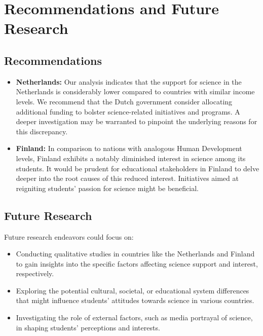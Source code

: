 \documentclass[12pt]{article}
\begin{document}
\section{Recommendations and Future Research}

\subsection{Recommendations}

\begin{itemize}
\item \textbf{Netherlands:} Our analysis indicates that the support for science in the Netherlands is considerably lower compared to countries with similar income levels. We recommend that the Dutch government consider allocating additional funding to bolster science-related initiatives and programs. A deeper investigation may be warranted to pinpoint the underlying reasons for this discrepancy.

\item \textbf{Finland:} In comparison to nations with analogous Human Development levels, Finland exhibits a notably diminished interest in science among its students. It would be prudent for educational stakeholders in Finland to delve deeper into the root causes of this reduced interest. Initiatives aimed at reigniting students' passion for science might be beneficial.
\end{itemize}

\subsection{Future Research}

Future research endeavors could focus on:
\begin{itemize}
\item Conducting qualitative studies in countries like the Netherlands and Finland to gain insights into the specific factors affecting science support and interest, respectively.

\item Exploring the potential cultural, societal, or educational system differences that might influence students' attitudes towards science in various countries.

\item Investigating the role of external factors, such as media portrayal of science, in shaping students' perceptions and interests.
\end{itemize}
\end{document}
